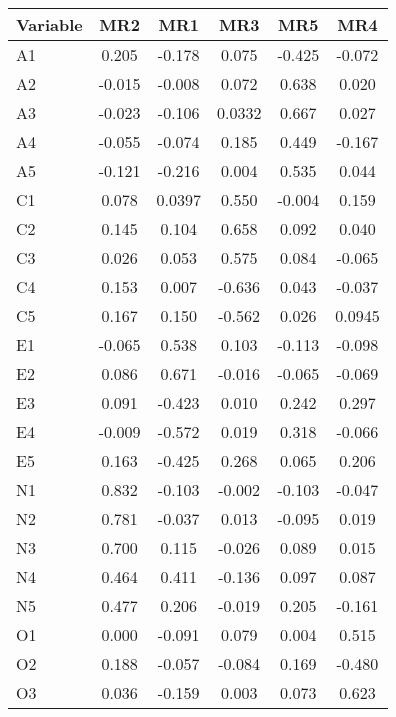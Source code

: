\documentclass{report}
\begin{document}
\begin{table}[h!]
  \begin{center}
    \label{tab:table1}
    \begin{tabular}{|l|c|c|c|c|c|} 
    \hline
      \textbf{Variable} & \textbf{MR2} & \textbf{MR1} & \textbf{MR3} & \textbf{MR5} & \textbf{MR4}\\
      \hline
A1    &    0.205& -0.178 & 0.075 &-0.425 &-0.072\\
\hline
A2    &    -0.015& -0.008&  0.072&  0.638 & 0.020\\
\hline
A3    &    -0.023& -0.106&  0.0332&  0.667 &0.027\\
\hline
A4    &    -0.055& -0.074&  0.185 &0.449 &-0.167\\
\hline
A5    &    -0.121&  -0.216&  0.004&  0.535&  0.044\\
\hline
C1    &     0.078&  0.0397 & 0.550& -0.004 & 0.159\\
\hline
C2    &     0.145&  0.104 & 0.658 & 0.092  &0.040\\
\hline
C3    &     0.026&  0.053 & 0.575 &0.084 &-0.065\\
\hline
C4   &     0.153&  0.007& -0.636 & 0.043 &-0.037\\
\hline
C5    &     0.167&  0.150&  -0.562& 0.026 & 0.0945\\
\hline
E1    &    -0.065&  0.538&  0.103 &-0.113 &-0.098\\
\hline
E2    &     0.086&  0.671& -0.016 &-0.065 &-0.069\\
\hline
E3    &     0.091&  -0.423&  0.010& 0.242 &0.297\\
\hline
E4    &    -0.009&  -0.572&  0.019&  0.318& -0.066\\
\hline
E5    &     0.163&  -0.425&  0.268& 0.065 & 0.206\\
\hline
N1    &     0.832&  -0.103& -0.002& -0.103& -0.047\\
\hline
N2    &     0.781& -0.037 & 0.013 &-0.095 & 0.019\\
\hline
N3    &     0.700&  0.115 &-0.026 & 0.089 & 0.015\\
\hline
N4    &     0.464& 0.411 &-0.136  &0.097  &0.087\\
\hline
N5    &     0.477&  0.206& -0.019 & 0.205 &-0.161\\
\hline
O1    &     0.000& -0.091 & 0.079 & 0.004 & 0.515\\
\hline
O2    &     0.188& -0.057 &-0.084 & 0.169 &-0.480\\
\hline
O3    &     0.036& -0.159 & 0.003 & 0.073 & 0.623\\

\end{tabular}
\end{center}
\end{table}
\end{document}
